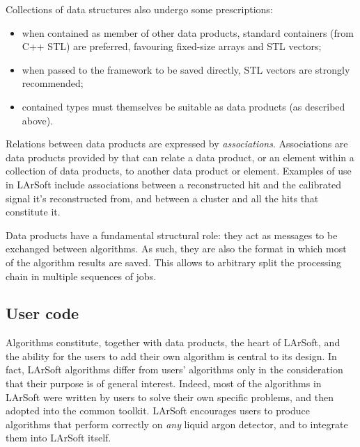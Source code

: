 Collections of data structures also undergo some prescriptions:
\begin{itemize}
   \item when contained as member of other data products,
      standard containers (from C++ STL) are preferred,
      favouring fixed-size arrays and STL vectors;
   \item when passed to the framework to be saved directly,
      STL vectors are strongly recommended;
   \item contained types must themselves be suitable as data products
      (as described above).
\end{itemize}

Relations between data products are expressed by \emph{associations}.
Associations are data products provided by \ART
that can relate a data product, or an element within a collection of data products,
to another data product or element.
Examples of use in LArSoft include associations between a
reconstructed hit and the calibrated signal it's reconstructed from, and
between a cluster and all the hits that constitute it.

Data products have a fundamental structural role:
they act as messages to be exchanged between algorithms.
As such, they are also the format in which most of the algorithm results are saved.
This allows to arbitrary split the processing chain in multiple sequences of jobs.


\subsection{User code}
\label{ssec:Development:UserCode}

Algorithms constitute, together with data products, the heart of LArSoft,
and the ability for the users to add their own algorithm is central to its design.
In fact, LArSoft algorithms differ from users' algorithms
only in the consideration that their purpose is of general interest.
Indeed, most of the algorithms in LArSoft were written by users to solve their own specific problems,
and then adopted into the common toolkit.
LArSoft encourages users to produce algorithms that perform correctly on \emph{any} liquid argon detector,
and to integrate them into LArSoft itself.

